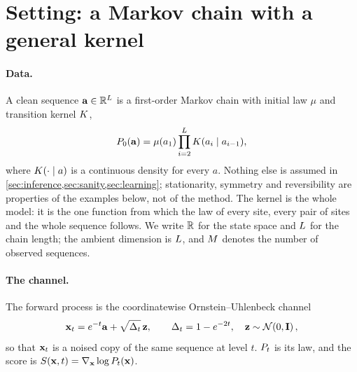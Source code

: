 \section{Setting: a Markov chain with a general kernel}
\label{sec:setup}

\paragraph{Data.}
A clean sequence $\mathbf{a}\in\mathbb{R}^{L}$ is a first-order Markov chain with initial law $\mu$ and
transition kernel $K$,
\begin{equation}
  P_0(\mathbf{a})=\mu(a_1)\prod_{i=2}^{L}K(a_i\mid a_{i-1}),
  \label{eq:prior}
\end{equation}
where $K(\cdot\mid a)$ is a continuous density for every $a$. Nothing else is assumed in
\cref{sec:inference,sec:sanity,sec:learning}; stationarity, symmetry and reversibility are
properties of the examples below, not of the method. The kernel is the whole model: it is the
one function from which the law of every site, every pair of sites and the whole sequence
follows. We write $\mathbb{R}$ for the state space and $L$ for the chain length; the
ambient dimension is $L$, and $M$ denotes the number of observed sequences.

\paragraph{The channel.}
The forward process is the coordinatewise Ornstein--Uhlenbeck channel
\begin{equation}
  \mathbf{x}_t = e^{-t}\mathbf{a} + \sqrt{\Delta_t}\,\mathbf{z},\qquad \Delta_t=1-e^{-2t},\quad \mathbf{z}\sim\mathcal{N}\!\left(0,\mathbf{I}\right),
  \label{eq:channel}
\end{equation}
so that $\mathbf{x}_t$ is a noised copy of the same sequence at level $t$. $P_t$ is its law, and
the score is $S(\mathbf{x},t)=\nabla_{\mathbf{x}}\log P_t(\mathbf{x})$.

